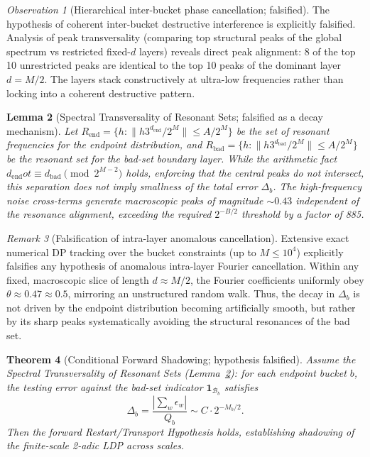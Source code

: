 \documentclass[12pt,a4paper]{article}
\newtheorem{theorem}{Theorem}[section]
\newtheorem{lemma}[theorem]{Lemma}
\theoremstyle{remark}
\newtheorem{remark}[theorem]{Remark}
\newtheorem{observation}[theorem]{Observation}
\begin{document}
\begin{observation}[Hierarchical inter-bucket phase cancellation; falsified]
\label{obs:hierarchical_inter_bucket}
The hypothesis of coherent inter-bucket destructive interference is explicitly falsified. Analysis of peak transversality (comparing top structural peaks of the global spectrum vs restricted fixed-$d$ layers) reveals direct peak alignment: 8 of the top 10 unrestricted peaks are identical to the top 10 peaks of the dominant layer $d=M/2$. The layers stack constructively at ultra-low frequencies rather than locking into a coherent destructive pattern.
\end{observation}
\begin{lemma}[Spectral Transversality of Resonant Sets; falsified as a decay mechanism]
\label{lem:spectral_transversality}
Let $R_{\text{end}} = \{h : \|h 3^{d_{\text{end}}} / 2^M\| \le A/2^M\}$ be the set of resonant frequencies for the endpoint distribution, and $R_{\text{bad}} = \{h : \|h 3^{d_{\text{bad}}} / 2^M\| \le A/2^M\}$ be the resonant set for the bad-set boundary layer.
While the arithmetic fact $d_{\text{end}}
ot\equiv d_{\text{bad}} \pmod{2^{M-2}}$ holds, enforcing that the central peaks do not intersect, this separation does not imply smallness of the total error $\Delta_b$. The high-frequency noise cross-terms generate macroscopic peaks of magnitude $\sim 0.43$ independent of the resonance alignment, exceeding the required $2^{-B/2}$ threshold by a factor of 885.
\end{lemma}
\begin{remark}[Falsification of intra-layer anomalous cancellation]
Extensive exact numerical DP tracking over the bucket constraints (up to $M \le 10^4$) explicitly falsifies any hypothesis of anomalous intra-layer Fourier cancellation. Within any fixed, macroscopic slice of length $d \approx M/2$, the Fourier coefficients uniformly obey $\theta \approx 0.47 \approx 0.5$, mirroring an unstructured random walk. Thus, the decay in $\Delta_b$ is not driven by the endpoint distribution becoming artificially smooth, but rather by its sharp peaks systematically avoiding the structural resonances of the bad set.
\end{remark}
\begin{theorem}[Conditional Forward Shadowing; hypothesis falsified]
\label{thm:conditional_shadowing}
Assume the Spectral Transversality of Resonant Sets (Lemma~\ref{lem:spectral_transversality}):
for each endpoint bucket $b$, the testing error against the bad-set indicator $\mathbf{1}_{\mathcal{B}_b}$ satisfies
\[
\Delta_b = \frac{|\sum_w \epsilon_w|}{Q_b} \sim C \cdot 2^{-M_b/2}.
\]
Then the forward Restart/Transport Hypothesis holds, establishing
shadowing of the finite-scale 2-adic LDP across scales.
\end{theorem}
\end{document}
